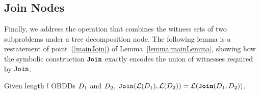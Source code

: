 \subsection{Join Nodes}

Finally, we address the operation that combines the witness sets of two subproblems under a tree decomposition node. The following lemma is a restatement of point~(\ref{mainJoin}) of Lemma~\ref{lemma:mainLemma}, showing how the symbolic construction $\texttt{\textbf{Join}}$ exactly encodes the union of witnesses required by $\texttt{Join}$.





\begin{lemma}
\label{lemma:SymbolicJoin}
Given length $l$ OBDDs $D_1$ and $D_2$, $\texttt{Join}(\mathcal{L}(D_1),\mathcal{L}(D_2)) = \mathcal{L}(\texttt{\textbf{Join}}(D_1,D_2))$.
\end{lemma}

